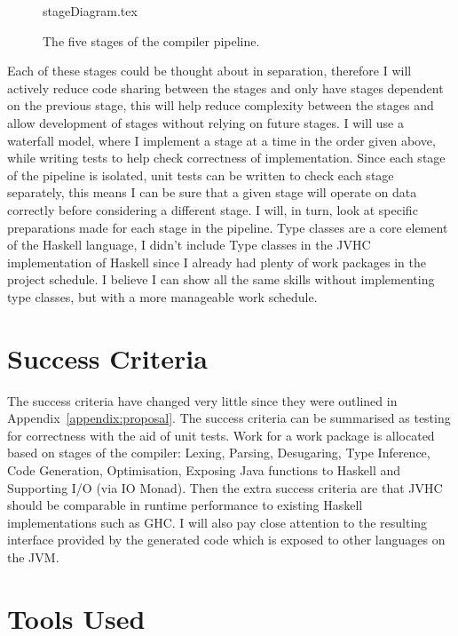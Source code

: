 \documentclass[float=false, crop=false]{standalone}
\begin{document}
\begin{figure}
  \centering
  {stageDiagram.tex}
  \caption{The five stages of the compiler pipeline.}
\end{figure}
Each of these stages could be thought about in separation, therefore I will actively 
reduce code sharing between the stages and only have stages dependent 
on the previous stage, this will help reduce complexity between the stages and 
allow development of stages without relying on future 
stages. I will use a waterfall model, where I implement a stage
at a time in the order given above, while writing tests to help check
correctness of implementation. Since each stage of the pipeline
is isolated, unit tests can be written to check each stage separately, this means 
I can be sure that a given stage will operate on data correctly before considering
a different stage.
I will, in turn, look at specific preparations made for each stage in the pipeline.
Type classes are a core element of the Haskell language, I didn't include Type classes
in the JVHC implementation of Haskell since I already had plenty of work packages in
the project schedule. I believe I can show all the same skills without implementing type classes, 
but with a more manageable work schedule.

\section{Success Criteria}

The success criteria have changed very little since they were outlined in
Appendix~\ref{appendix:proposal}. 
The success criteria can be summarised as testing for correctness
with the aid of unit tests. 
Work for a work package is allocated based on stages of the compiler:
Lexing, Parsing, Desugaring, Type Inference,
Code Generation, Optimisation, Exposing Java functions to Haskell and
Supporting I/O (via IO Monad). 
Then the extra success criteria are that JVHC should be
comparable in runtime performance to existing Haskell implementations 
such as GHC. 
I will also pay close attention to the resulting interface provided by the generated
code which is exposed to other languages on the JVM.

\section{Tools Used}
\end{document}
